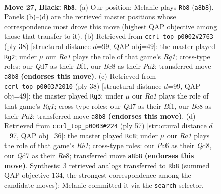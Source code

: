 \documentclass[11pt]{article}
\begin{document}
\clearpage

\begin{figure}[p]\centering
\begin{subfigure}{0.46\textwidth}\centering
\resizebox{\linewidth}{!}{%
\newchessgame
\chessboard[
  setfen={r1b1rk2/3q3p/ppn2P2/2p1p1p1/P3Q3/2P2P2/6PP/1KN1RBNR b - - 1 27},
  showmover=false,
  pgfstyle=straightmove, color=movearrow, markmove={a8-b8}
]}
\caption{}
\end{subfigure}\hfill
\begin{subfigure}{0.46\textwidth}\centering
\resizebox{\linewidth}{!}{%
\newchessgame
\chessboard[
  setfen={r1b1r1k1/4Pppp/p2p4/2q1n1P1/1p1NPQ2/8/PPP4P/2KR1BR1 w - - 3 20},
  showmover=false,
  pgfstyle=straightmove, color=movearrow, markmove={g1-g2}
]}
\caption{}
\end{subfigure}
\\[4pt]
\begin{subfigure}{0.46\textwidth}\centering
\resizebox{\linewidth}{!}{%
\newchessgame
\chessboard[
  setfen={r1b1r1k1/4Pppp/p2p4/2q1n1P1/1p1NPQ2/8/PPP4P/2KR1BR1 w - - 3 20},
  showmover=false,
  pgfstyle=straightmove, color=movearrow, markmove={g1-g3}
]}
\caption{}
\end{subfigure}\hfill
\begin{subfigure}{0.46\textwidth}\centering
\resizebox{\linewidth}{!}{%
\newchessgame
\chessboard[
  setfen={1r1qrbk1/1b3p2/3p2p1/1p2n2p/1P1BP3/6QP/2B2PPN/2R1R1K1 b - - 0 29},
  showmover=false,
  pgfstyle=straightmove, color=movearrow, markmove={b8-c8}
]}
\caption{}
\end{subfigure}
\caption{\textbf{Move 27, Black: \texttt{Rb8}.} (a) Our position; Melanie plays \texttt{Rb8} (\texttt{a8b8}). Panels (b)--(d) are the retrieved master positions whose correspondence most drove this move (highest QAP objective among those that transfer to it). (b) Retrieved from \texttt{ccrl\_top\_p0002\#2763} (ply 38) [structural distance $d$=99, QAP obj=49]: the master played \texttt{Rg2}; under $\mu$ our \emph{Ra1} plays the role of that game's \emph{Rg1}; cross-type roles: our \emph{Q}d7 as their \emph{B}f1, our \emph{B}c8 as their \emph{P}a2; transferred move \texttt{a8b8} \textbf{(endorses this move)}. (c) Retrieved from \texttt{ccrl\_top\_p0003\#2010} (ply 38) [structural distance $d$=99, QAP obj=49]: the master played \texttt{Rg3}; under $\mu$ our \emph{Ra1} plays the role of that game's \emph{Rg1}; cross-type roles: our \emph{Q}d7 as their \emph{B}f1, our \emph{B}c8 as their \emph{P}a2; transferred move \texttt{a8b8} \textbf{(endorses this move)}. (d) Retrieved from \texttt{ccrl\_top\_p0003\#224} (ply 57) [structural distance $d$=97, QAP obj=36]: the master played \texttt{Rc8}; under $\mu$ our \emph{Ra1} plays the role of that game's \emph{Rb1}; cross-type roles: our \emph{P}a6 as their \emph{Q}d8, our \emph{Q}d7 as their \emph{R}e8; transferred move \texttt{a8b8} \textbf{(endorses this move)}. Synthesis: 3 retrieved analogs transferred to \texttt{Rb8} (summed QAP objective 134, the strongest correspondence among the candidate moves); Melanie committed it via the \texttt{search} selector.}
\label{fig:thought-m53}
\end{figure}
\end{document}
